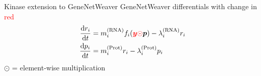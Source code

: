 \begin{frame}{Kinase extension to GeneNetWeaver}
GeneNetWeaver differentials with change in \textcolor{red}{red}
\begin{subequations}
\begin{align}
\dv{r_i}{t} &=
m_i^{(\text{RNA})} f_i(
\textcolor{red}{\boldsymbol{y} \odot }
\boldsymbol{p}) - \lambda_i^{(\text{RNA})} r_i
\\
\dv{p_i}{t} &=
m_i^{(\text{Prot})} r_i - \lambda_i^{(\text{Prot})} p_i
\end{align}
\end{subequations}
$\odot$ = element-wise multiplication
\end{frame}
